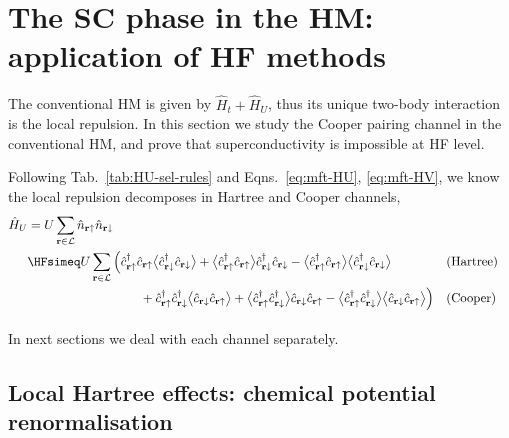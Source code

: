 \section{The SC phase in the HM: application of HF methods}\label{sec:sc-hm}

The conventional HM is given by $\hat H_t + \hat H_U$, thus its unique two-body interaction is the local repulsion. In this section we study the Cooper pairing channel in the conventional HM, and prove that superconductivity is impossible at HF level.

Following Tab.~\ref{tab:HU-sel-rules} and Eqns.~\eqref{eq:mft-HU}, \eqref{eq:mft-HV}, we know the local repulsion decomposes in Hartree and Cooper channels,
\[
\begin{aligned}
	\hat H_U &= U \sum_{\mathbf{r}\in\mathcal{L}} \hat n_{\mathbf{r}\uparrow} \hat n_{\mathbf{r}\downarrow} \\
	&\HFsimeq U \sum_{\mathbf{r}\in\mathcal{L}} \Big(
	\hat c_{\mathbf{r}\uparrow}^\dagger \hat c_{\mathbf{r}\uparrow} \big\langle \hat c_{\mathbf{r}\downarrow}^\dagger \hat c_{\mathbf{r}\downarrow} \big\rangle + \big\langle \hat c_{\mathbf{r}\uparrow}^\dagger \hat c_{\mathbf{r}\uparrow} \big\rangle \hat c_{\mathbf{r}\downarrow}^\dagger \hat c_{\mathbf{r}\downarrow} - \big\langle \hat c_{\mathbf{r}\uparrow}^\dagger \hat c_{\mathbf{r}\uparrow} \big\rangle  \big\langle \hat c_{\mathbf{r}\downarrow}^\dagger \hat c_{\mathbf{r}\downarrow} \big\rangle &&(\text{Hartree}) \\
	&\phantom{\HFsimeq \sum_{{\mathbf{r}\uparrow}\neq{\mathbf{r}\downarrow}} V_{{\mathbf{r}\uparrow}{\mathbf{r}\downarrow}}}
	+ \hat c_{\mathbf{r}\uparrow}^\dagger \hat c_{\mathbf{r}\downarrow}^\dagger \big\langle \hat c_{\mathbf{r}\downarrow} \hat c_{\mathbf{r}\uparrow} \big\rangle + \big\langle \hat c_{\mathbf{r}\uparrow}^\dagger \hat c_{\mathbf{r}\downarrow}^\dagger \big\rangle \hat c_{\mathbf{r}\downarrow} \hat c_{\mathbf{r}\uparrow} - \big\langle \hat c_{\mathbf{r}\uparrow}^\dagger \hat c_{\mathbf{r}\downarrow}^\dagger \big\rangle  \big\langle \hat c_{\mathbf{r}\downarrow} \hat c_{\mathbf{r}\uparrow} \big\rangle
	\Big) &&(\text{Cooper})
\end{aligned}
\]
In next sections we deal with each channel separately.

\subsection{Local Hartree effects: chemical potential renormalisation}\label{subsec:sc-l-hartree}

